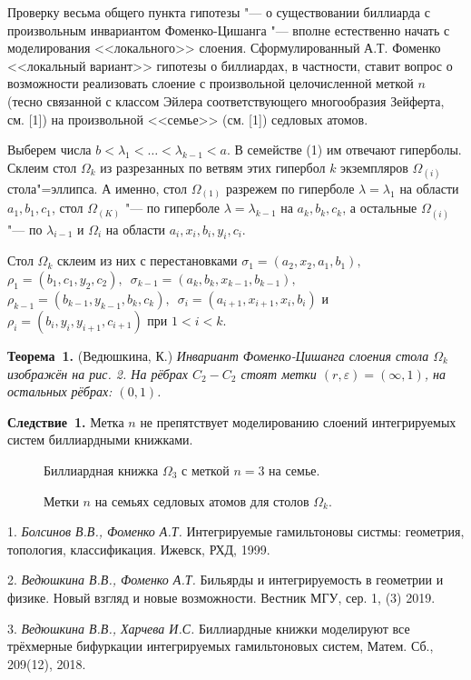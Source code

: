 Проверку весьма общего пункта гипотезы "--- о существовании биллиарда с произвольным инвариантом Фоменко-Цишанга "--- вполне естественно начать с моделирования <<локального>> слоения. Сформулированный А.Т. Фоменко <<локальный вариант>> гипотезы о биллиардах, в частности, ставит вопрос о возможности реализовать слоение с произвольной целочисленной меткой $n$ (тесно связанной с классом Эйлера соответствующего многообразия Зейферта, см. [1]) на произвольной <<семье>> (см. [1]) седловых атомов.

Выберем числа $b < \lambda_1 < \dots < \lambda_{k-1} < a$. В семействе (1) им отвечают гиперболы. Склеим стол $\Omega_k$ из разрезанных по ветвям этих гипербол $k$ экземпляров $\Omega_{(i)}$ стола"=эллипса. А именно, стол $\Omega_{(1)}$ разрежем по гиперболе $\lambda = \lambda_1$ на области $a_1, b_1, c_1$, стол $\Omega_{(K)}$ "--- по гиперболе $\lambda = \lambda_{k-1}$ на $a_k, b_k, c_k$, а остальные $\Omega_{(i)}$ "--- по $\lambda_{i-1}$ и $\Omega_i$ на области $a_i, x_i, b_i, y_i, c_i$.

Стол $\Omega_k$ склеим из них с перестановками $\sigma_1 = (a_2, x_2, a_1, b_1),$\, $\rho_1 = (b_1, c_1, y_2, c_2),$\, $\sigma_{k-1} = (a_{k}, b_{k}, x_{k-1}, b_{k-1}) ,$\, $\rho_{k-1} = (b_{k-1}, y_{k-1}, b_{k}, c_{k}),$\, $\sigma_i = (a_{i+1}, x_{i+1}, x_i, b_i)$ и $\rho_i = (b_{i}, y_{i}, y_{i+1}, c_{i+1})$ при $1 < i < k$.

\textbf{Теорема~1.} (Ведюшкина, К.) {\it Инвариант Фоменко-Цишанга слоения стола $\Omega_k$ изображён на рис. 2. На рёбрах $C_2 - C_2$ стоят метки $(r, \varepsilon) = (\infty, 1)$, на остальных рёбрах: $(0, 1)$.}

\textbf{Следствие~1.} Метка $n$ не препятствует моделированию слоений интегрируемых систем биллиардными книжками.




 \begin{figure}[h!]
\caption{Биллиардная книжка $\Omega_3$ с меткой $n = 3$ на семье.} \label{WildMol}
 \end{figure}


 \begin{figure}[h!]
\caption{Метки $n$ на семьях седловых атомов для столов $\Omega_k$.} \label{WildMol}
 \end{figure}









\litlist

1. {\it Болсинов В.В., Фоменко А.Т.} Интегрируемые гамильтоновы систмы: геометрия, топология, классификация. Ижевск, РХД, 1999.


2. {\it Ведюшкина В.В., Фоменко А.Т.} Бильярды и интегрируемость в геометрии и физике. Новый взгляд и новые возможности. Вестник МГУ, сер. 1, (3) 2019.

3. {\it Ведюшкина В.В., Харчева И.С.} Биллиардные книжки моделируют все трёхмерные бифуркации интегрируемых гамильтоновых систем, Матем. Сб., 209(12), 2018.
